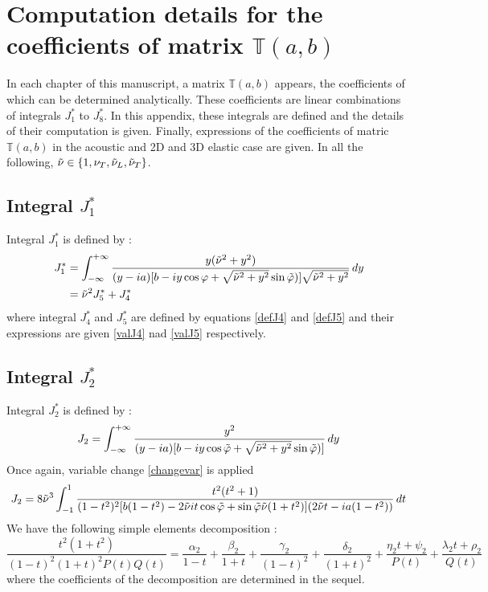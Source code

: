 \chapter{Computation details for the coefficients of matrix $\mathbb{T}(a,b)$}
\label{matT}
In each chapter of this manuscript, a matrix $\mathbb{T}(a,b)$ appears, the coefficients of which can be determined analytically. These coefficients are linear combinations of integrals $J_1^*$ to $J_8^*$. In this appendix, these integrals are defined and the details of their computation is given. Finally, expressions of the coefficients of matric $\mathbb{T}(a,b)$ in the acoustic and 2D and 3D elastic case are given. In all the following, $\tilde{\nu} \in \{1,\nu_T, \tilde{\nu}_L,\tilde{\nu}_T\}$.

\section{Integral $J_1^*$}
\label{calcJ1}
Integral $J_1^*$ is defined by :
\begin{equation}
\begin{split}
J_1^*&= \int_{-\infty}^{+\infty} \frac{y (\tilde{\nu}^2+y^2)}{(y-ia)\lbrack b-iy\cos \varphi+ \sqrt{\tilde{\nu}^2+y^2} \sin\tilde{\varphi}) \rbrack\sqrt{\tilde{\nu}^2+y^2}} \, dy\\
&=\tilde{\nu}^2J_5^*+J_4^*
\end{split}
\label{defJ1}
\end{equation}
where integral $J_4^*$ and $J_5^*$ are defined by equations \eqref{defJ4} and \eqref{defJ5} and their expressions are given \eqref{valJ4} nad \eqref{valJ5} respectively.

\section{Integral $J_2^*$}
\label{calcJ2}
Integral $J_2^*$ is defined by :
\begin{equation}
J_2 =\int_{-\infty}^{+\infty} \frac{y^2}{(y-ia)\lbrack b-iy\cos \tilde{\varphi}+ \sqrt{\tilde{\nu}^2+y^2} \sin \tilde{\varphi}) \rbrack} \, dy
\label{defJ2}
\end{equation}
Once again, variable change \eqref{changevar} is applied 
\begin{equation}
J_2=8\tilde{\nu}^3 \int_{-1}^1 \frac{t^2(t^2+1)}{(1-t^2)^2\lbrack b(1-t^2)-2\tilde{\nu} it\cos\tilde{\varphi}+ \sin \tilde{\varphi} \tilde{\nu}(1+t^2)\rbrack(2\tilde{\nu} t-ia(1-t^2))}\, dt
\end{equation}
We have the following simple elements decomposition :
\begin{equation}
\frac{t^2(1+t^2)}{(1-t)^2(1+t)^2P(t)Q(t)}=\frac{\alpha_2}{1-t}+\frac{\beta_2}{1+t}+\frac{\gamma_2}{(1-t)^2}+\frac{\delta_2}{(1+t)^2}+\frac{\eta_2 t+\psi_2}{P(t)}+\frac{\lambda_2 t +\rho_2}{Q(t)}
\label{decompJ2}
\end{equation}
where the coefficients of the decomposition are determined in the sequel.

